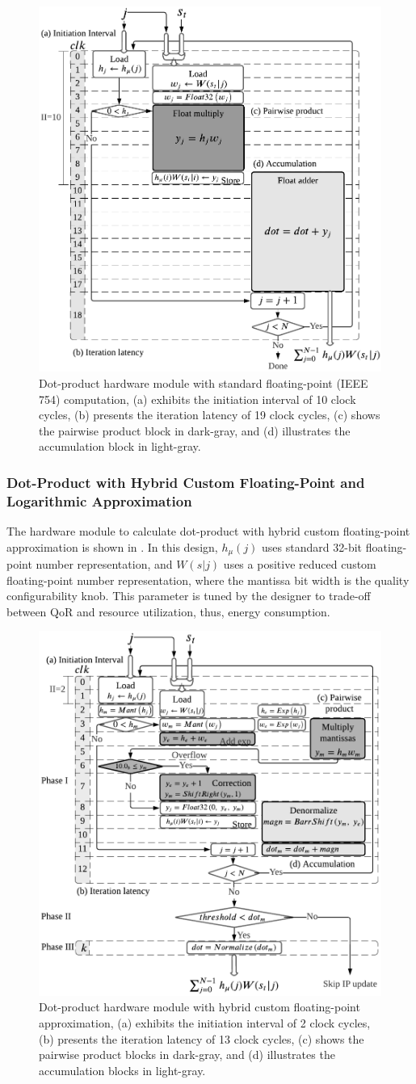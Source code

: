 \begin{figure}[b!]
	\centering
	\includegraphics[width=0.5\columnwidth]{./chapters/sbs_accelerator/figures/dot_product_float.pdf}
	\caption{Dot-product hardware module with standard floating-point (IEEE 754) computation, (a) exhibits the initiation interval of 10 clock cycles, (b) presents the iteration latency of 19 clock cycles, (c) shows the pairwise product block in dark-gray, and (d) illustrates the accumulation block in light-gray.}
	\label{fig:dot_product_float}
\end{figure}

\subsubsection{Dot-Product with Hybrid Custom Floating-Point and Logarithmic Approximation}
 The hardware module to calculate dot-product with hybrid custom floating-point approximation is shown in . In this design, $h_\mu(j)$ uses standard 32-bit floating-point number representation, and $W(s|j)$ uses a positive reduced custom floating-point number representation, where the mantissa bit width is the quality configurability knob. This parameter is tuned by the designer to trade-off between QoR and resource utilization, thus, energy consumption.
 
 \begin{figure}
 	\centering
 	\includegraphics[width=0.5\columnwidth]{./chapters/sbs_accelerator/figures/dot_product.pdf}
 	\caption{Dot-product hardware module with hybrid custom floating-point approximation, (a) exhibits the initiation interval of 2 clock cycles, (b) presents the iteration latency of 13 clock cycles, (c) shows the pairwise product blocks in dark-gray, and (d) illustrates the accumulation blocks in light-gray.}
 	\label{fig:dot_product_custom}
 \end{figure}
 
